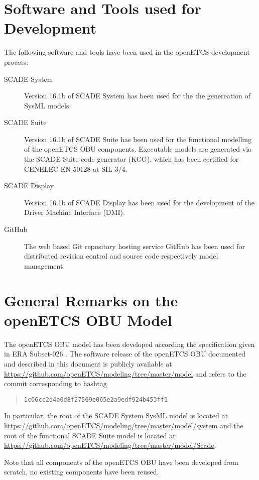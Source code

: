 \section{Software and Tools used for Development}

The following software and tools have been used in the openETCS development process:
\begin{description}
\item[SCADE System] Version 16.1b of SCADE System has been used for the the genereation of SysML models.
\item[SCADE Suite] Version 16.1b of SCADE Suite has been used for the functional modelling of the openETCS OBU components. Executable models are generated via the SCADE Suite code generator (KCG), which has been certified for CENELEC EN 50128 at SIL 3/4.
\item[SCADE Display] Version 16.1b of SCADE Display has been used for the development of the Driver Machine Interface (DMI).
\item[GitHub] The web based Git repository hosting service GitHub has been used for distributed revision control and source code respectively model management.
\end{description}


\section{General Remarks on the openETCS OBU Model}
The openETCS OBU model has been developed according the specification given in ERA Subset-026 \cite{subset-026}. The software release of the openETCS OBU documented and described in this document is publicly available at \url{https://github.com/openETCS/modeling/tree/master/model} and refers to the commit corresponding to hashtag 
\begin{quotation}
\texttt{1c06cc2d4a0d8f27569e065e2a9edf924b453ff1}
\end{quotation}
In particular, the root of the SCADE System SysML model is located at
\url{https://github.com/openETCS/modeling/tree/master/model/system}
and the root of the functional SCADE Suite model is located at
\url{https://github.com/openETCS/modeling/tree/master/model/Scade}.

Note that all components of the openETCS OBU have been developed from scratch, no existing components have been reused.